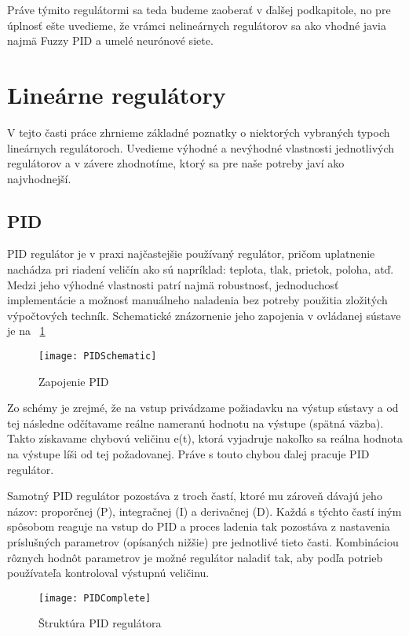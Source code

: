 Práve týmito regulátormi sa teda budeme zaoberať v ďalšej podkapitole, no pre úplnosť ešte uvedieme, že vrámci nelineárnych regulátorov sa ako vhodné javia najmä Fuzzy PID a umelé neurónové siete.

\section{Lineárne regulátory}


V tejto časti práce zhrnieme základné poznatky o niektorých vybraných typoch lineárnych regulátoroch. Uvedieme výhodné a nevýhodné vlastnosti jednotlivých regulátorov a v závere zhodnotíme, ktorý sa pre naše potreby javí ako najvhodnejší.

\subsection{PID}


\ac{PID} regulátor je v praxi najčastejšie používaný regulátor, pričom uplatnenie nachádza  pri riadení veličín ako sú napríklad: teplota, tlak, prietok, poloha, atď. Medzi jeho výhodné vlastnosti patrí najmä robustnosť, jednoduchosť implementácie a možnosť manuálneho naladenia bez potreby použitia zložitých výpočtových techník.  Schematické znázornenie jeho zapojenia v ovládanej sústave je na \figurename~\ref{fig:PIDSchematic}

\begin{figure}[h]
\centering
\texttt{[image: PIDSchematic]}
\caption{Zapojenie PID}
\label{fig:PIDSchematic}
\end{figure}

Zo schémy je zrejmé, že na vstup privádzame požiadavku na výstup sústavy a od tej následne odčítavame reálne nameranú hodnotu na výstupe (spätná väzba). Takto získavame chybovú veličinu e(t), ktorá vyjadruje nakoľko sa reálna hodnota na výstupe líši od tej požadovanej. Práve s touto chybou ďalej pracuje \ac{PID} regulátor.

Samotný PID regulátor pozostáva z troch častí, ktoré mu zároveň dávajú jeho názov: proporčnej (P), integračnej (I) a derivačnej (D). Každá s týchto častí iným spôsobom reaguje na vstup do PID a proces ladenia tak pozostáva z nastavenia príslušných parametrov (opísaných nižšie) pre jednotlivé tieto časti. Kombináciou rôznych hodnôt parametrov je možné regulátor naladiť tak, aby podľa potrieb používateľa kontroloval výstupnú veličinu. 

\begin{figure}
\centering
\texttt{[image: PIDComplete]}
\caption{Štruktúra PID regulátora}
\label{fig:PIDComplete}
\end{figure}

